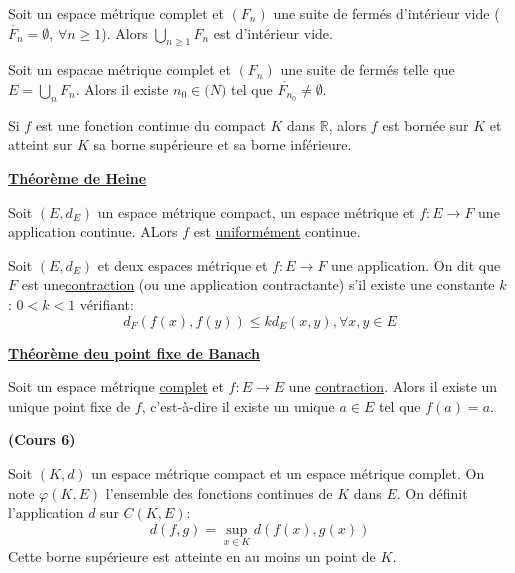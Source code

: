 \documentclass[12pt,a4paper]{article}
\begin{document}
\begin{flushleft}
\begin{cor}
Soit \edm un espace métrique complet et $(F_n)$ une suite de fermés d'intérieur vide ($\mathring{F_n} = \emptyset$, $\forall n \geq 1$). Alors  $\bigcup\limits_{n \geq 1} F_n$ est d'intérieur vide.
\end{cor}

\begin{cor}
Soit \edm un espacae métrique complet et $(F_n)$ une suite de fermés telle que $E = \bigcup\limits_{n} F_n$. Alors il existe $n_0 \in \mathbb(N)$ tel que $\mathring{F_{n_0}} \neq \emptyset$.
\end{cor}

\begin{thm}
Si $f$ est une fonction continue du compact $K$ dans $\mathbb{R}$, alors $f$ est bornée sur $K$ et atteint sur $K$ sa borne supérieure et sa borne inférieure.
 \end{thm}


\underline{\textbf{Théorème de Heine}}
\begin{thm}
Soit $(E,d_E)$ un espace métrique compact, \fdm un espace métrique et $f: E \longrightarrow F$ une application continue. ALors $f$ est \underline{uniformément} continue.
 \end{thm}

\begin{mydef}
Soit $(E,d_E)$ et \fdm deux espaces métrique et $f: E \longrightarrow F$ une application. On dit que $F$ est une\underline{contraction} (ou une application contractante) s'il existe une constante $k$ : $0 < k < 1$ vérifiant:
$$ d_F (f(x), f(y)) \leq k d_E (x,y), \forall x, y \in E$$
 \end{mydef}


\underline{\textbf{Théorème deu point fixe de Banach}}
\begin{thm}
Soit \edm un espace métrique \underline{complet} et $f: E \longrightarrow E$ une \underline{contraction}. Alors il existe un unique point fixe de $f$, c'est-à-dire il existe un unique $a \in E$ tel que $f(a) = a$.
 \end{thm}



\textbf{(Cours 6)}


\begin{rem}
Soit $(K,d)$ un espace métrique compact et \edm un espace métrique complet. On note $\varphi (K,E)$ l'ensemble des fonctions continues de $K$ dans $E$. On définit l'application $d$ sur $C(K,E) $: $$ d(f,g) = \sup\limits_{x \in K} d(f(x), g(x))$$ Cette borne  supérieure est atteinte en au moins un point de $K$.
\end{rem}


\end{flushleft}
\end{document}
